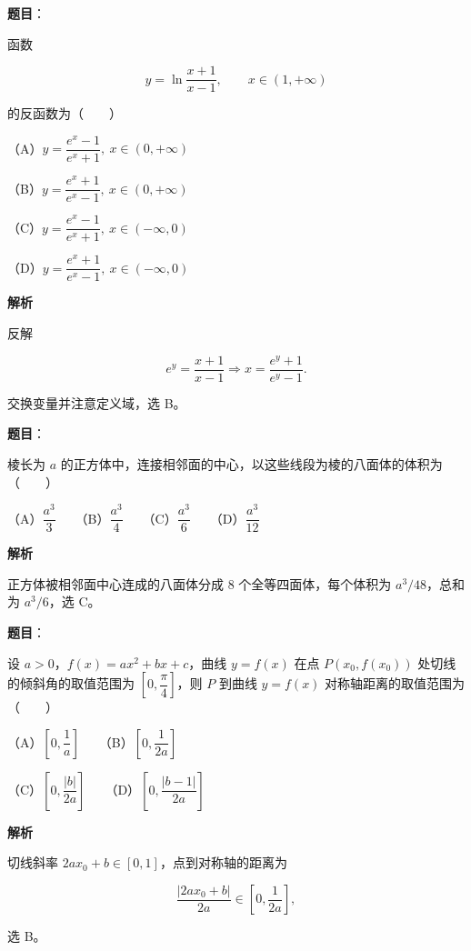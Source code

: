 \begin{answer}

\textbf{题目}：

函数

\nopagebreak[4]
\[
y=\ln\frac{x+1}{x-1},\qquad x\in(1,+\infty)
\]

的反函数为\mbox{（　　）}

（A）$y=\dfrac{e^x-1}{e^x+1},\ x\in(0,+\infty)$

（B）$y=\dfrac{e^x+1}{e^x-1},\ x\in(0,+\infty)$

（C）$y=\dfrac{e^x-1}{e^x+1},\ x\in(-\infty,0)$

（D）$y=\dfrac{e^x+1}{e^x-1},\ x\in(-\infty,0)$

\textbf{解析}

反解

\nopagebreak[4]
\[
e^y=\frac{x+1}{x-1}
\Longrightarrow x=\frac{e^y+1}{e^y-1}.
\]

交换变量并注意定义域，选 B。


\end{answer}
\begin{answer}

\textbf{题目}：

棱长为 $a$ 的正方体中，连接相邻面的中心，以这些线段为棱的八面体的体积为\mbox{（　　）}

（A）$\dfrac{a^3}{3}$　　（B）$\dfrac{a^3}{4}$　　（C）$\dfrac{a^3}{6}$　　（D）$\dfrac{a^3}{12}$

\textbf{解析}

正方体被相邻面中心连成的八面体分成 8 个全等四面体，每个体积为 $a^3/48$，总和为 $a^3/6$，选 C。


\end{answer}
\begin{answer}

\textbf{题目}：

设 $a>0$，$f(x)=ax^2+bx+c$，曲线 $y=f(x)$ 在点 $P(x_0,f(x_0))$ 处切线的倾斜角的取值范围为 $\left[0,\dfrac\pi4\right]$，则 $P$ 到曲线 $y=f(x)$ 对称轴距离的取值范围为\mbox{（　　）}

（A）$\left[0,\dfrac1a\right]$　　（B）$\left[0,\dfrac1{2a}\right]$

（C）$\left[0,\dfrac{|b|}{2a}\right]$　　（D）$\left[0,\dfrac{|b-1|}{2a}\right]$

\textbf{解析}

切线斜率 $2ax_0+b\in[0,1]$，点到对称轴的距离为

\nopagebreak[4]
\[
\frac{|2ax_0+b|}{2a}\in\left[0,\frac1{2a}\right],
\]

选 B。


\end{answer}
